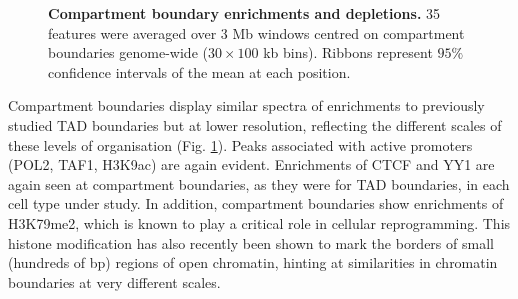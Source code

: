 \documentclass[a4paper,11pt,oneside]{book}
\begin{document}
\begin{figure}
\begin{center} 
\captionsetup{width=\textwidth}
\caption[Compartment boundary enrichments and depletions.]{ {\bf Compartment boundary enrichments and depletions.}
35 features were averaged over 3 Mb windows centred on compartment boundaries genome-wide ($30 \times 100$ kb bins). Ribbons represent $95\%$ confidence intervals of the mean at each position.
}\label{fig:allcompartments}
\end{center}
\end{figure} 

Compartment boundaries display similar
spectra of enrichments to previously studied TAD boundaries
\cite{Dixon2012} but at lower resolution, reflecting the different
scales of these levels of organisation (Fig. \ref{fig:allcompartments}). 
Peaks associated with active promoters (POL2, TAF1, H3K9ac) are again
evident. Enrichments of CTCF and YY1 are again seen
at compartment boundaries, as they were for TAD boundaries, in each
cell type under study. In addition, compartment boundaries show
enrichments of H3K79me2, which is known to play a critical role in
cellular reprogramming.\cite{Onder2012} This histone modification has
also recently been shown to mark the borders of small (hundreds of bp)
regions of open chromatin,\cite{Chai2013} hinting at similarities in chromatin boundaries at very different scales.
\end{document}
